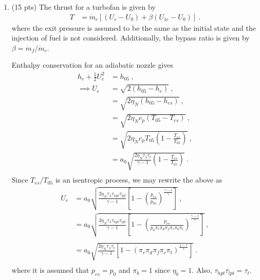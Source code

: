 \documentclass[12pt]{article}
\begin{document}
\begin{enumerate}[label=(\alph*)]
\begin{enumerate}[label=(\roman{*})]
			\item (15 pts)
				The thrust for a turbofan is given by 
				\begin{equation}
					\label{EQ_2_TFTHRUST}					\begin{aligned}
						T&=\boxed{\dot m_c [(U_e-U_0)+\beta(U_{1e}-U_0)]}\ .
					\end{aligned}
				\end{equation}
				where the exit pressure is assumed to be the same as the initial state and the injection of fuel is not considered. Additionally, the bypass ratio is given by $\beta=\dot m_f /\dot m_c$.
				
				Enthalpy conservation for an adiabatic nozzle gives
				\begin{equation}					
					\begin{aligned}
						h_e+\frac{1}{2}U_e^2&=h_{05}\ , \\ 
						\implies U_e&=\sqrt{2(h_{05}-h_e)}\ , \\
						&=\sqrt{2\eta_N(h_{05}-h_{es})}\ , \\
						&=\sqrt{2\eta_Nc_p(T_{05}-T_{es})}\ , \\
						&=\sqrt{2\eta_Nc_pT_{05}\left(1-\frac{T_{es}}{T_{05}}\right)}\ , \\
						&=a_0\sqrt{\frac{2\eta_N\tau_\lambda\tau_t}{\gamma-1}\left(1-\frac{T_{es}}{T_{05}}\right)}\ . \\
					\end{aligned}
				\end{equation}
				Since $T_{es}/T_{05}$ is an isentropic process, we may rewrite the above as
				\begin{equation}					
					\begin{aligned}
						U_e&=a_0\sqrt{\frac{2\eta_N\tau_\lambda\tau_{hpt}\tau_{lpt}}{\gamma-1}\left[1-\left(\frac{p_{es}}{p_{05}}\right)^{\frac{\gamma-1}{\gamma}}\right]}\ , \\
						&=a_0\sqrt{\frac{2\eta_N\tau_\lambda\tau_{hpt}\tau_{lpt}}{\gamma-1}\left[1-\left(\frac{p_{es}}{p_0\pi_r\pi_d\pi_f\pi_c\pi_b\pi_{t}}\right)^{\frac{\gamma-1}{\gamma}}\right]}\ , \\ \\
						&=\boxed{a_0\sqrt{\frac{2\eta_N\tau_\lambda\tau_t}{\gamma-1}\left[1-\left(\pi_r\pi_d\pi_f\pi_c\pi_{t}\right)^{\frac{1-\gamma}{\gamma}}\right]}}\ . \\
					\end{aligned}
				\end{equation}
				where it is assumed that $p_{es}=p_0$ and $\pi_b=1$ since $\eta_b=1$. Also, $\tau_{hpt}\tau_{lpt}=\tau_t$.
				

\end{enumerate}
\end{enumerate}
\end{document}
